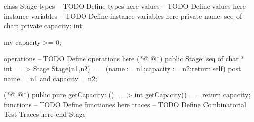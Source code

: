 \begin{vdmpp}[breaklines=true]
class Stage
types
-- TODO Define types here
values
-- TODO Define values here
instance variables
-- TODO Define instance variables here
private name: seq of char;
private capacity: int;

inv capacity >= 0;
 
operations
-- TODO Define operations here
(*@
\label{Stage:15}
@*)
  public Stage: seq of char * int ==> Stage
  Stage(n1,n2) == (name := n1;capacity := n2;return self)
  post name = n1 and capacity = n2;
  
(*@
\label{getCapacity:19}
@*)
  public pure getCapacity: () ==> int
  getCapacity() == return capacity;
functions
-- TODO Define functiones here
traces
-- TODO Define Combinatorial Test Traces here
end Stage
\end{vdmpp}
